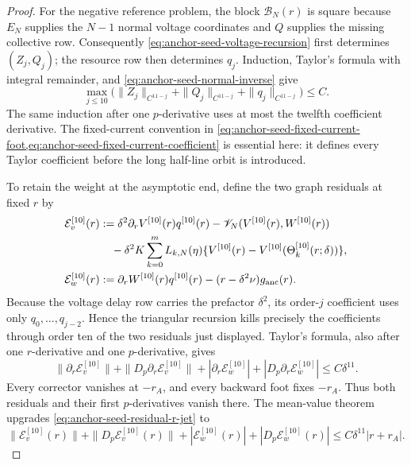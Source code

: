 \begin{proof}
For the negative reference problem, the block
\(\mathscr B_N(r)\) is square because \(E_N\) supplies the \(N-1\) normal
voltage coordinates and \(Q\) supplies the missing collective row.
Consequently \cref{eq:anchor-seed-voltage-recursion} first determines
\((Z_j,Q_j)\); the resource row then determines \(q_j\).  Induction,
Taylor's formula with integral remainder, and
\cref{eq:anchor-seed-normal-inverse} give
\[
 \max_{j\le10}\bigl(
 \|Z_j\|_{C^{11-j}}+\|Q_j\|_{C^{11-j}}
       +\|q_j\|_{C^{11-j}}\bigr)\le C .
\]
The same induction after one \(p\)-derivative uses at most the twelfth
coefficient derivative.  The fixed-current convention in
\cref{eq:anchor-seed-fixed-current-foot,eq:anchor-seed-fixed-current-coefficient}
is essential here: it defines every Taylor coefficient before the long
half-line orbit is introduced.

To retain the weight at the asymptotic end, define the two graph residuals
at fixed \(r\) by
\begin{align}
 \mathcal E_v^{[10]}(r)
 &:=\delta^2\partial_rV^{[10]}(r)q^{[10]}(r)
   -\mathscr V_N(V^{[10]}(r),W^{[10]}(r))\notag\\
 &\quad-\delta^2K\sum_{k=0}^mL_{k,N}(\eta)
   \{V^{[10]}(r)-V^{[10]}(\Theta_k^{[10]}(r;\delta))\},\notag\\
 \mathcal E_w^{[10]}(r)
 &:=\partial_rW^{[10]}(r)q^{[10]}(r)
     -(r-\delta^2\nu)g_{\rm anc}(r).                \label{eq:anchor-seed-fixed-current-residuals}
\end{align}
Because the voltage delay row carries the prefactor \(\delta^2\), its
order-\(j\) coefficient uses only \(q_0,\ldots,q_{j-2}\).  Hence the
triangular recursion kills precisely the coefficients through order ten
of the two residuals just displayed.  Taylor's formula, also after one
\(r\)-derivative and one \(p\)-derivative, gives
\begin{equation}
 \|\partial_r\mathcal E_v^{[10]}\|
 +\|D_p\partial_r\mathcal E_v^{[10]}\|
 +|\partial_r\mathcal E_w^{[10]}|
 +|D_p\partial_r\mathcal E_w^{[10]}|
 \le C\delta^{11}.                                  \label{eq:anchor-seed-residual-r-jet}
\end{equation}
Every corrector vanishes at \(-r_A\), and every backward foot fixes
\(-r_A\).  Thus both residuals and their first \(p\)-derivatives vanish
there.  The mean-value theorem upgrades
\cref{eq:anchor-seed-residual-r-jet} to
\begin{equation}
 \|\mathcal E_v^{[10]}(r)\|+
   \|D_p\mathcal E_v^{[10]}(r)\|
 +|\mathcal E_w^{[10]}(r)|+|D_p\mathcal E_w^{[10]}(r)|
 \le C\delta^{11}|r+r_A|.                           \label{eq:anchor-seed-residual-anchor-factor}
\end{equation}


\end{proof}
